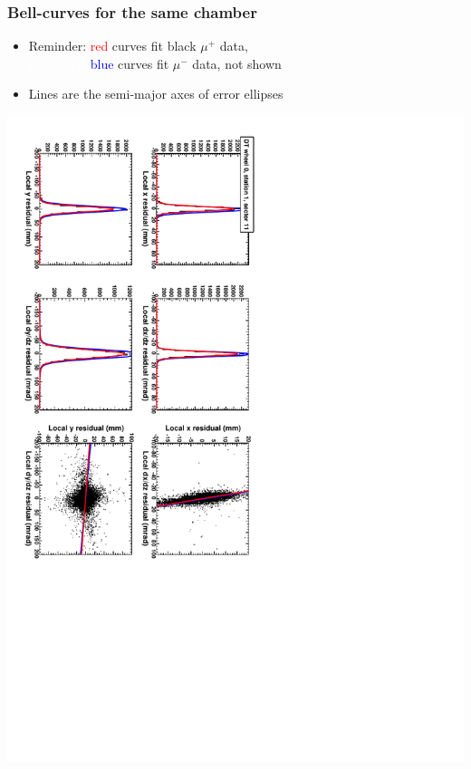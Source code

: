 \documentclass[compress]{beamer}
\begin{document}
\begin{frame}
\frametitle{Bell-curves for the same chamber}

\begin{itemize}
\item Reminder: \textcolor{red}{red} curves fit black $\mu^+$ data, \\ \textcolor{white}{Reminder:} \textcolor{blue}{blue} curves fit $\mu^-$ data, not shown
\item Lines are the semi-major axes of error ellipses
\end{itemize}

\vfill
\includegraphics[height=\linewidth, angle=90]{datafit_sawtooth2.pdf}
\end{frame}
\end{document}
